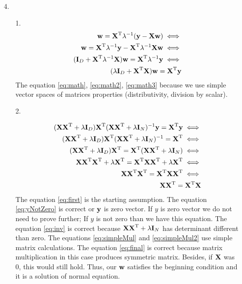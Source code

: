 \documentclass[10pt,a4paper]{article}
\begin{document}
\begin{enumerate}
\begin{enumerate}
\begin{enumerate}
\end{enumerate}
\end{enumerate}
\item[4.]
\begin{enumerate}
\item[1.]
\begin{align}
\textbf{\text{{w}}}=\textbf{\text{{X}}} ^ \text{T}\lambda^{-1}(\textbf{\text{{y}}}-\textbf{\text{{X}}}\textbf{\text{{w}}}) \nonumber\iff\\
\textbf{\text{{w}}}=\textbf{\text{{X}}} ^ \text{T}\lambda^{-1}\textbf{\text{{y}}}-
\textbf{\text{{X}}} ^ \text{T}\lambda^{-1}\textbf{\text{{X}}}\textbf{\text{{w}}} \iff \label{eq:math}\\
(\textbf{\text{{I}}}_D + \textbf{\text{{X}}} ^ \text{T}\lambda^{-1}\textbf{\text{{X}}})\textbf{\text{{w}}}=\textbf{\text{{X}}} ^ \text{T}\lambda^{-1}\textbf{\text{{y}}} \label{eq:math2}\iff \\
(\lambda\textbf{\text{{I}}}_D + \textbf{\text{{X}}} ^ \text{T}\textbf{\text{{X}}})\textbf{\text{{w}}}=\textbf{\text{{X}}} ^ \text{T}\textbf{\text{{y}}}\label{eq:math3}
\end{align}
The equation \ref{eq:math}, \ref{eq:math2}, \ref{eq:math3} because we use simple vector spaces of matrices properties (distributivity, division by scalar).
\item[2.]

\begin{align}
(\textbf{\text{{X}}}\textbf{\text{{X}}} ^ \text{T} + \lambda \textbf{\text{{I}}}_D)\textbf{\text{{X}}} ^ \text{T}( \textbf{\text{{X}}} \textbf{\text{{X}}} ^ \text{T}  + \lambda \textbf{\text{{I}}}_N)^{-1}\textbf{\text{{y}}} = 
\textbf{\text{{X}}} ^ \text{T}\textbf{\text{{y}}} \iff  \label{eq:first}\\
(\textbf{\text{{X}}}\textbf{\text{{X}}} ^ \text{T} + \lambda \textbf{\text{{I}}}_D)\textbf{\text{{X}}} ^ \text{T}( \textbf{\text{{X}}} \textbf{\text{{X}}} ^ \text{T}  + \lambda \textbf{\text{{I}}}_N)^{-1} = 
\textbf{\text{{X}}} ^ \text{T} \iff \label{eq:yNotZero}\\
(\textbf{\text{{X}}}\textbf{\text{{X}}} ^ \text{T} + \lambda \textbf{\text{{I}}}_D)\textbf{\text{{X}}} ^ \text{T} = 
\textbf{\text{{X}}} ^ \text{T} ( \textbf{\text{{X}}} \textbf{\text{{X}}} ^ \text{T}  + \lambda \textbf{\text{{I}}}_N)\iff \label{eq:inv}\\
\textbf{\text{{X}}}\textbf{\text{{X}}} ^ \text{T}\textbf{\text{{X}}} ^ \text{T}  + \lambda \textbf{\text{{X}}} ^ \text{T}= 
\textbf{\text{{X}}} ^ \text{T}  \textbf{\text{{X}}} \textbf{\text{{X}}} ^ \text{T}  + \lambda \textbf{\text{{X}}} ^ \text{T}\iff \label{eq:simpleMul}\\
\textbf{\text{{X}}}\textbf{\text{{X}}} ^ \text{T}\textbf{\text{{X}}} ^ \text{T} = 
\textbf{\text{{X}}} ^ \text{T}  \textbf{\text{{X}}} \textbf{\text{{X}}} ^ \text{T} \iff \label{eq:simpleMul2}\\
\textbf{\text{{X}}}\textbf{\text{{X}}} ^ \text{T} = \textbf{\text{{X}}} ^ \text{T}  \textbf{\text{{X}}} \label{eq:final}
\end{align}
The equation \ref{eq:first} is the starting assumption. The equation \ref{eq:yNotZero} is correct or $\textbf{\text{{y}}}$ is zero vector. If $y$ is zero vector we do not need to prove further; If $y$ is not zero than we have this equation. The equation \ref{eq:inv} is correct because $\textbf{\text{{X}}} \textbf{\text{{X}}} ^ \text{T}  + \lambda \textbf{\text{{I}}}_N$ has determinant different than zero. The equations \ref{eq:simpleMul} and \ref{eq:simpleMul2} use simple matrix calculations. The equation \ref{eq:final} is correct because matrix multiplication in this case produces symmetric matrix. Besides, if $\textbf{\text{{X}}}$ was 0, this would still hold.
Thus, our $\textbf{\text{{w}}}$ satisfies the beginning condition and it is a solution of normal equation.  

\end{enumerate}
\end{enumerate}
\end{document}
